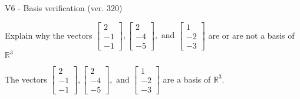 \begin{exercise}
  \begin{exerciseTitle}V6 - Basis verification (ver. 320)\end{exerciseTitle}
  \begin{exerciseStatement}
    Explain why the vectors \(\left[\begin{array}{r}
2 \\
-1 \\
-1
\end{array}\right] , \left[\begin{array}{r}
2 \\
-4 \\
-5
\end{array}\right] , \text{ and } \left[\begin{array}{r}
1 \\
-2 \\
-3
\end{array}\right]\) are or are not a basis of \(\mathbb{R}^3\)	


  \end{exerciseStatement}
  \begin{exerciseAnswer}
   The vectors \(\left[\begin{array}{r}
2 \\
-1 \\
-1
\end{array}\right] , \left[\begin{array}{r}
2 \\
-4 \\
-5
\end{array}\right] , \text{ and } \left[\begin{array}{r}
1 \\
-2 \\
-3
\end{array}\right]\) 
  	 are  a basis of \(\mathbb{R}^3\).
  


  \end{exerciseAnswer}
\end{exercise}